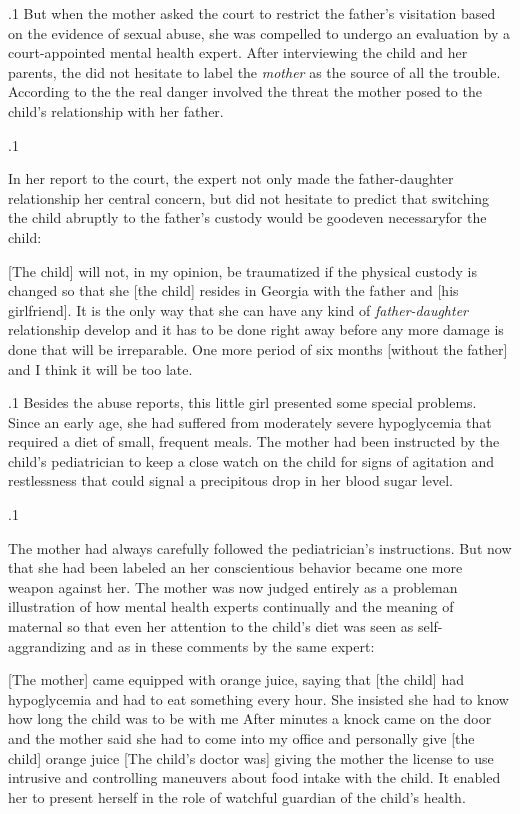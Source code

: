 \documentclass[11pt, twoside]{article}
\begin{document}
{{}%

\p.1{%
But when the mother asked the court to restrict the father’s visitation
based on the evidence of sexual abuse, she was compelled to undergo an
evaluation by a court-appointed mental health expert. After interviewing the child and her parents, the  did not hesitate to label
the \textit{mother} as the source of all the
trouble. According to the  the real
danger involved the threat the mother posed to the child’s relationship
with her father.
}%

\p.1{%
In her report to the court, the expert not only made the
father-daughter relationship her central concern, but did not hesitate to predict
that switching the child abruptly to the father’s custody would be
good\mdash{}even necessary\mdash{}for the child:

\begin{blockQuote}
{[The child]} will not, in my opinion, be traumatized if the physical
custody is changed so that she [the child] resides in Georgia with
the father and [his girlfriend]. It is the only way that she can have
any kind of \textit{father-daughter} relationship develop and it has to be
done right away before any more damage is done that will be irreparable. One more period of six months [without the father] and
I think it will be too late.
\end{blockQuote}

}%

\p.1{%
Besides the abuse reports, this little girl presented some special
problems. Since an early age, she had suffered from moderately severe hypoglycemia that required a diet of small, frequent meals. The
mother had been instructed by the child’s pediatrician to keep a close
watch on the child for signs of agitation and restlessness that could signal
a precipitous drop in her blood sugar level.
}%

\p.1{%
The mother had always carefully followed the pediatrician’s instructions. But now that she had been labeled an  her conscientious behavior became one more weapon against her. The mother was
now judged entirely as a problem\mdash{}an illustration of how mental health
experts continually  and  the meaning of maternal \mdash{}so that even her attention to the child’s diet was seen as
self-aggrandizing and  as in these comments by the same
expert:

\begin{blockQuote}
{[The mother]} came equipped with orange juice, saying that [the
child] had hypoglycemia and had to eat something every hour. She
insisted she had to know how long the child was to be with me\ellFour{2pt}{2pt}
After minutes a knock came on the door and the mother said she
had to come into my office and personally give [the child] orange
juice\ellFour{2pt}{2pt} [The child’s doctor was] giving the mother the license
to use intrusive and controlling maneuvers about food intake with
the child. It enabled her to present herself in the role of watchful
guardian of the child’s health.
\end{blockQuote}

}}
\end{document}
